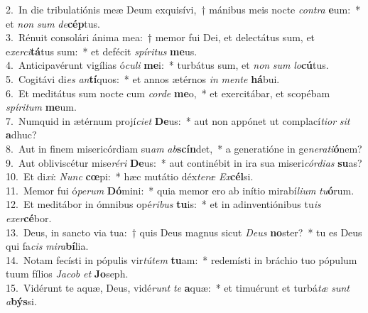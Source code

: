 {2.~}In die tribulatiónis meæ Deum exquisívi,~† mánibus meis nocte \textit{con}\textit{tra} \textbf{e}um:~* et \textit{non} \textit{sum} \textit{de}\textbf{cép}tus.\\
{3.~}Rénuit consolári ánima mea:~† memor fui Dei, et delectátus sum, et e\textit{xer}\textit{ci}\textbf{tá}tus sum:~* et defécit \textit{spí}\textit{ri}\textit{tus} \textbf{me}us.\\
{4.~}Anticipavérunt vigílias ó\textit{cu}\textit{li} \textbf{me}i:~* turbátus sum, et \textit{non} \textit{sum} \textit{lo}\textbf{cú}tus.\\
{5.~}Cogitávi di\textit{es} \textit{an}\textbf{tí}quos:~* et annos ætérnos \textit{in} \textit{men}\textit{te} \textbf{há}bui.\\
{6.~}Et meditátus sum nocte cum \textit{cor}\textit{de} \textbf{me}o,~* et exercitábar, et scopébam \textit{spí}\textit{ri}\textit{tum} \textbf{me}um.\\
{7.~}Numquid in ætérnum projí\textit{ci}\textit{et} \textbf{De}us:~* aut non appónet ut complací\textit{ti}\textit{or} \textit{sit} \textbf{a}dhuc?\\
{8.~}Aut in finem misericórdiam su\textit{am} \textit{ab}\textbf{scín}det,~* a generatióne in ge\textit{ne}\textit{ra}\textit{ti}\textbf{ó}nem?\\
{9.~}Aut obliviscétur mise\textit{ré}\textit{ri} \textbf{De}us:~* aut continébit in ira sua miseri\textit{cór}\textit{di}\textit{as} \textbf{su}as?\\
{10.~}Et di\textit{xi}: \textit{Nunc} \textbf{cœ}pi:~* hæc mutátio déx\textit{te}\textit{ræ} \textit{Ex}\textbf{cél}si.\\
{11.~}Memor fui ó\textit{pe}\textit{rum} \textbf{Dó}mini:~* quia memor ero ab inítio mirabí\textit{li}\textit{um} \textit{tu}\textbf{ó}rum.\\
{12.~}Et meditábor in ómnibus opé\textit{ri}\textit{bus} \textbf{tu}is:~* et in adinventiónibus tu\textit{is} \textit{e}\textit{xer}\textbf{cé}bor.\\
{13.~}Deus, in sancto via tua:~† quis Deus magnus sicut \textit{De}\textit{us} \textbf{no}ster?~* tu es Deus qui fa\textit{cis} \textit{mi}\textit{ra}\textbf{bí}lia.\\
{14.~}Notam fecísti in pópulis vir\textit{tú}\textit{tem} \textbf{tu}am:~* redemísti in bráchio tuo pópulum tuum fílios \textit{Ja}\textit{cob} \textit{et} \textbf{Jo}seph.\\
{15.~}Vidérunt te aquæ, Deus, vidé\textit{runt} \textit{te} \textbf{a}quæ:~* et timuérunt et turbá\textit{tæ} \textit{sunt} \textit{a}\textbf{býs}si.\\
